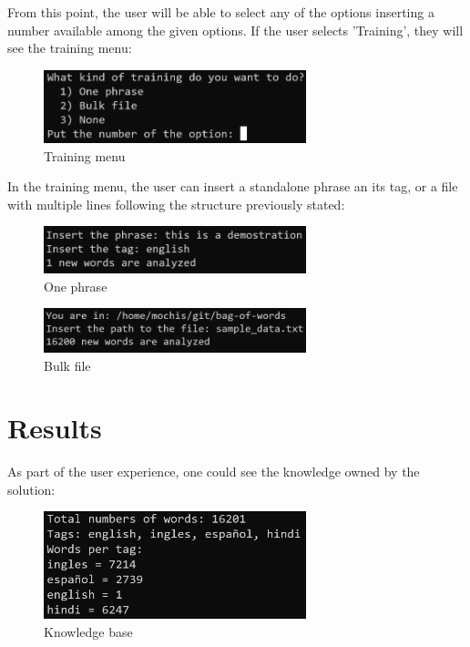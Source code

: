 \documentclass[sigconf,12pt,review=false,natbib=false]{acmart}
\begin{document}
From this point, the user will be able to select any of the options inserting a number available among the given
options. If the user selects 'Training', they will see the training menu: \\

\begin{figure}[h!]
    \centering
    \includegraphics[width=3in]{training_menu}
    \caption{Training menu}
    \label{fig:training_menu}
\end{figure}

In the training menu, the user can insert a standalone phrase an its tag, or a file with multiple lines following the
structure previously stated: \\

\begin{figure}[h!]
    \centering
    \includegraphics[width=3in]{one_phrase}
    \caption{One phrase}
    \label{fig:one_phrase}
\end{figure}

\begin{figure}[h!]
    \centering
    \includegraphics[width=3in]{bulk_file}
    \caption{Bulk file}
    \label{fig:bulk_file}
\end{figure}

\section{Results}

As part of the user experience, one could see the knowledge owned by the solution: \\

\begin{figure}[h!]
    \centering
    \includegraphics[width=3in]{knowledge}
    \caption{Knowledge base}
    \label{fig:knowledge}
\end{figure}
\end{document}
